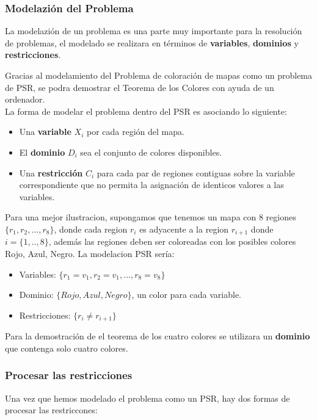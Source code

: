 \documentclass[a4paper]{article}
\begin{document}
\subsubsection{Modelazión del Problema}
La modelazión de un problema es una parte muy importante para la resolución de problemas, el modelado se realizara en términos de \textbf{variables}, \textbf{dominios} y \textbf{restricciones}.

Gracias al modelamiento del Problema de coloración de mapas como un problema de PSR, se podra demostrar el Teorema de los Colores con ayuda de un ordenador.\\ 

La forma de modelar el problema dentro del PSR es asociando lo siguiente:
\begin{itemize}
\item Una \textbf{variable} $X_i$ por cada región del mapa.
\item El \textbf{dominio} $D_i$ sea el conjunto de colores disponibles.
\item Una \textbf{restricción} $C_i$ para cada par de regiones contiguas sobre la variable correspondiente que no permita la asignación de identicos valores a las variables.
\end{itemize}

Para una mejor ilustracion, supongamos que tenemos un mapa con 8 regiones  $\{r_1, r_2,..., r_8\}$, donde cada region $r_i$ es adyacente a la region $r_{i+1}$ donde $i = \{1,..,8\}$, además las regiones deben ser coloreadas con los posibles colores Rojo, Azul, Negro. La modelacion PSR sería:
\begin{itemize}
\item Variables: $\{r_1 = v_1, r_2 = v_1,..., r_8 = v_8\}$
\item Dominio: $\{Rojo, Azul, Negro\}$, un color para cada variable.
\item Restricciones: $\{r_i \not= r_{i+1}\}$
\end{itemize}

Para la demostración de el teorema de los cuatro colores se utilizara un \textbf{dominio} que contenga solo cuatro colores.




\subsubsection{Procesar las restricciones}
Una vez que hemos modelado el problema como un PSR, hay dos formas de procesar las restriccones:
\end{document}
